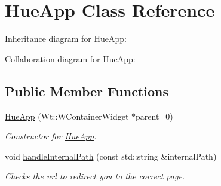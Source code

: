 \hypertarget{classHueApp}{}\section{Hue\+App Class Reference}
\label{classHueApp}


Inheritance diagram for Hue\+App\+:


Collaboration diagram for Hue\+App\+:
\subsection*{Public Member Functions}
\begin{DoxyCompactItemize}
\item 
\hyperlink{classHueApp_a34bbbd56837e397473a85d9d6adc99fa}{Hue\+App} (Wt\+::\+W\+Container\+Widget $\ast$parent=0)
\begin{DoxyCompactList}\small\item\em Constructor for \hyperlink{classHueApp}{Hue\+App}. \end{DoxyCompactList}\item 
void \hyperlink{classHueApp_a434baacf5c3e79b09cbedf8057060cbb}{handle\+Internal\+Path} (const std\+::string \&internal\+Path)
\begin{DoxyCompactList}\small\item\em Checks the url to redirect you to the correct page. \end{DoxyCompactList}\end{DoxyCompactItemize}
